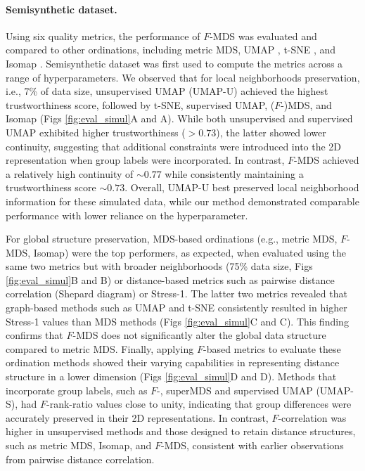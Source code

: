 \documentclass[10pt,letterpaper]{article}
\newcommand{\1}{{\rm 1}\kern-0.24em{\rm I}}
\begin{document}
\paragraph*{Semisynthetic dataset.} \label{sec:eval_sim}
Using six quality metrics, the performance of $F$-MDS was evaluated and compared to other ordinations, including metric MDS, 
UMAP \cite{McInnes18}, t-SNE \cite{maaten08}, and Isomap \cite{tenenbaum00}. Semisynthetic dataset was first used to compute the metrics across a range of hyperparameters. We observed that for local neighborhoods preservation, i.e., 7\% of data size, unsupervised UMAP (UMAP-U) achieved the highest trustworthiness score, followed by t-SNE, supervised UMAP, ($F$-)MDS, and Isomap (Figs \ref{fig:eval_simul}A and A). While both unsupervised and supervised UMAP exhibited higher trustworthiness ($>0.73$), the latter showed lower continuity, suggesting that additional constraints were introduced into the 2D representation when group labels were incorporated. In contrast, $F$-MDS achieved a relatively high continuity of $\sim\!0.77$ while consistently maintaining a trustworthiness score $\sim\!0.73$. Overall, UMAP-U best preserved local neighborhood information for these simulated data, while our method demonstrated comparable performance with lower reliance on the hyperparameter. 

For global structure preservation, MDS-based ordinations (e.g., metric MDS, $F$-MDS, Isomap) were the top performers, as expected, when evaluated using the same two metrics but with broader neighborhoods (75\% data size, Figs \ref{fig:eval_simul}B and B) or distance-based metrics such as pairwise distance correlation (Shepard diagram) or Stress-1. The latter two metrics revealed that graph-based methods such as UMAP and t-SNE consistently resulted in higher Stress-1 values than MDS methods (Figs \ref{fig:eval_simul}C and C). This finding confirms that $F$-MDS does not significantly alter the global data structure compared to metric MDS. Finally, applying $F$-based metrics to evaluate these ordination methods showed their varying capabilities in representing distance structure in a lower dimension (Figs \ref{fig:eval_simul}D and D). Methods that incorporate group labels, such as $F$-, superMDS and supervised UMAP (UMAP-S), had $F$-rank-ratio values close to unity, indicating that group differences were accurately preserved in their 2D representations. In contrast, $F$-correlation was higher in unsupervised methods and those designed to retain distance structures, such as metric MDS, Isomap, and $F$-MDS, consistent with earlier observations from pairwise distance correlation. 
\end{document}

